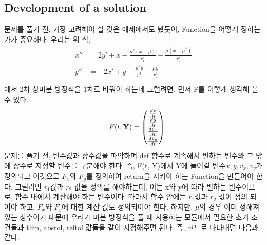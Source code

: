 \documentclass[11pt]{article}
\begin{document}
\subsection{Development of a solution} 
문제를 풀기 전, 가장 고려해야 할 것은 예제에서도 봤듯이, Function을 어떻게 정하는가가 중요하다. 우리는 위 식,
\begin{equation}
\begin{split}
\begin{aligned}
x'' &= 2y' + x - \frac{\mu^* (x + \mu)}{r_1^3} - \frac{\mu (x - \mu^*)}{r_2^3} \\
y'' &= -2x' + y - \frac{\mu^* y}{r_1^3} - \frac{\mu y}{r_2^3} \\
\end{aligned}
\end{split}
\end{equation}
에서 2차 상미분 방정식을 1차로 바꿔야 하는데 그럴려면, 먼저 F를 이렇게 생각해 볼 수 있다.
\begin{equation}
\mathbf
\quad\mathrm
\mathbf{F}(t, \mathbf{Y}) =
\begin{pmatrix}
\frac{dx}{dt}  \\
\frac{dy}{dt} \\
\frac{dv_{x}}{dt} \\
\frac{dv_{y}}{dt} \\
\end{pmatrix}
\end{equation}
문제를 풀기 전, 변수값과 상수값을 파악하며 def 함수로 계속해서 변하는 변수와 그 밖에 상수로 지정할 변수를 구분해야 한다. 즉, F(t, Y)에서 Y에 들어갈 변수$x, y, v_{x}, v_{y}$가 정의되고 이것으로  $F_{x}$와 $F_{y}$를 정의하여 return을 시켜야 하는 Function을 만들어야 한다. 그럴려면 $r_{1}$값과 $r_{2}$ 값을 정의를 해야하는데, 이는 x와 y에 따라 변하는 변수이므로, 함수 내에서 계산해야 하는 변수이다. 따라서 함수 안에는  $r_{1}$값과 $r_{2}$ 값이 정의 되어야 하고, $F_{x}$와 $F_{y}$에 대한 계산 값도 정의되어야 한다. 하지만, $\mu$의 경우 이미 정해져 있는 상수이기 때문에 우리가 미분 방정식을 풀 때 사용하는 모듈에서 필요한 초기 조건들과 tlim, abstol, reltol 값들을 같이 지정해주면 된다. 즉, 코드로 나타내면 다음과 같다.
\end{document}
